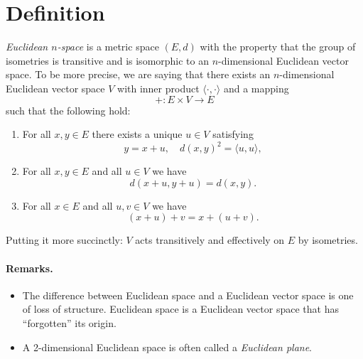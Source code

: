 \documentclass[12pt]{article}
\begin{document}
\section{Definition}
\emph{Euclidean $n$-space} is a metric space $(E,d)$
with the property that the group of isometries is transitive and is
isomorphic to an $n$-dimensional Euclidean vector space.  To be more
precise, we are saying that there exists an $n$-dimensional Euclidean
vector space $V$ with inner product $\langle \cdot,\cdot\rangle$ and a
mapping
\[ +: E\times V\to E \]
such that the following hold:
\begin{enumerate}
\item For all $x,y\in E$ there exists a unique $u\in V$ satisfying
\[ y=x+u,\quad d(x,y)^2=\langle u,u\rangle,\]
\item For all $x,y\in E$ and all $u\in V$ we have
\[ d(x+u,y+u)=d(x,y).\]
\item For all $x\in E$ and all $u,v\in V$ we have
\[ (x+u)+v=x+(u+v).\]
\end{enumerate}
Putting it more succinctly: $V$ acts transitively and effectively on
$E$ by isometries.

\paragraph{Remarks.}
\begin{itemize}
\item
The difference between Euclidean space and a Euclidean vector space is
one of loss of structure.  Euclidean space is a Euclidean vector space
that has ``forgotten'' its origin.
\item A 2-dimensional Euclidean space is often called a
  \emph{Euclidean plane}.
\end{itemize}
\end{document}

